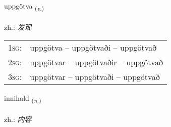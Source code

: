\documentclass[frontgrid, backgrid]{flacards}\usepackage[]{graphicx}\usepackage[]{xcolor}
\begin{document}
\renewcommand{\flhead}{\vskip5pt \fboxsep=0pt {\small\bfseries\footnotesize Sagnorð | 动词}}
\renewcommand{\fcfoot}{\vskip5pt \fboxsep=0pt \hspace{2pt}{\small\bfseries\footnotesize 3K}}

\renewcommand{\blhead}{\vskip5pt {\small\bfseries\footnotesize Sagnorð | 动词 }}
\renewcommand{\bcfoot}{\vskip5pt \hspace{2pt}{\small\bfseries\footnotesize 3K}}


{uppgötva \small{\textsubscript{(\textit{v.})}} \\[1ex] %
\textphonetic{[ʏhpkœtva]} \\
zh.: \emph{发现} \\  [2ex]
\renewcommand*{\arraystretch}{0.8}
\begin{tabular}{p{1cm}l}
\textsc{1sg}: & uppgötva -- uppgötvaði -- uppgötvað \\ 
\textsc{2sg}: & uppgötvar -- uppgötvaðir -- uppgötvað \\ 
\textsc{3sg}: & uppgötvar -- uppgötvaði -- uppgötvað \\ 
\end{tabular}
}

\renewcommand{\flhead}{\vskip5pt \fboxsep=0pt {\small\bfseries\footnotesize Nafnorð | 名词}}
\renewcommand{\fcfoot}{\vskip5pt \fboxsep=0pt \hspace{2pt}{\small\bfseries\footnotesize 3K}}

\renewcommand{\blhead}{\vskip5pt {\small\bfseries\footnotesize Nafnorð | 名词 }}
\renewcommand{\bcfoot}{\vskip5pt \hspace{2pt}{\small\bfseries\footnotesize 3K}}


{innihald \small{\textsubscript{(\textit{n.})}} \\[1ex] %
\textphonetic{[ɪnɪhalt]} \\
zh.: \emph{内容} \\  [2ex]
\renewcommand*{\arraystretch}{0.8}
}
\end{document}
